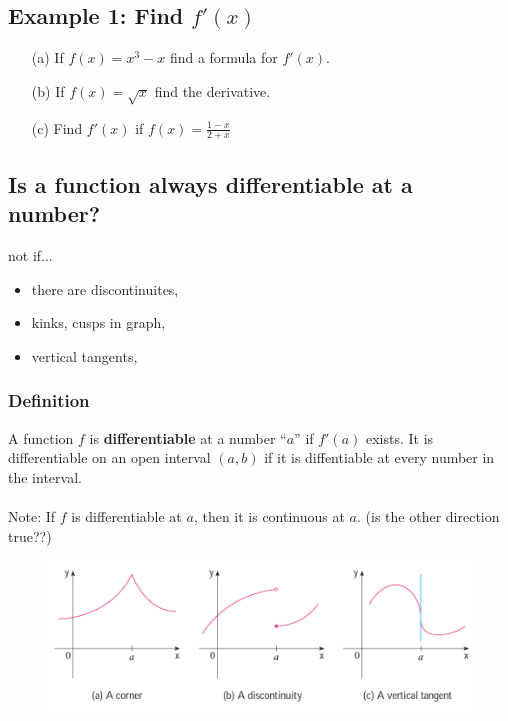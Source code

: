 \documentclass[10pt]{book}
\theoremstyle{definition}
\begin{document}
\subsection*{Example 1: Find $f'(x)$}
\begin{itemize}
    \item[(a)] If $f(x)=x^3-x$ find a formula for $f'(x)$.\vspace{5cm}
    \item[(b)] If $f(x)=\sqrt{x}$ find the derivative.\vspace{5cm}
    \item[(c)] Find $f'(x)$ if $\displaystyle f(x)=\frac{1-x}{2+x}$
\end{itemize}
\raggedbottom
\clearpage
\begin{tcolorbox}
\subsection*{Is a function always differentiable at a number?} not if...
\begin{itemize}
    \item there are discontinuites,
    \item kinks, cusps in graph,
    \item vertical tangents,
\end{itemize}
\subsubsection*{Definition}
A function $f$ is \textbf{differentiable} at a number ``$a$'' if $f'(a)$ exists. It is differentiable on an open interval $(a,b)$ if it is diffentiable at every number in the interval.\\ \\
Note: If $f$ is differentiable at $a$, then it is continuous at $a$. (is the other direction true??)
\end{tcolorbox}
\begin{figure}[h!]
    \centering
    \includegraphics[scale=0.65]{fig1.png}
\end{figure}
\end{document}
